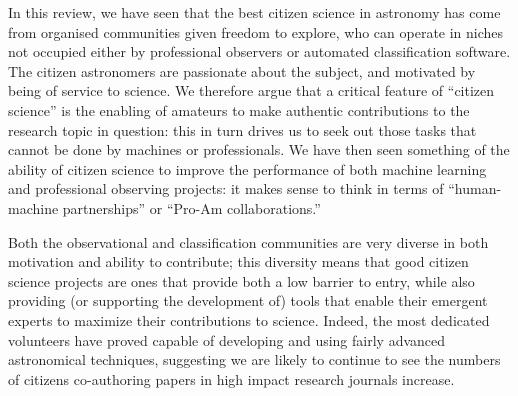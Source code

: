 \documentclass{ar2e}
\begin{document}
In this review, we have seen that the best citizen science in astronomy has
come from organised communities given freedom to explore, who can operate in 
niches not occupied either by professional observers or automated 
classification software. The citizen astronomers are passionate about the
subject, and  motivated by being of service to science. We therefore argue
that a critical feature of ``citizen science'' is the enabling of amateurs to
make authentic contributions to the research topic in question: this in turn
drives us to seek out those  tasks that cannot be done by machines or
professionals. We have then seen something of the ability of citizen science
to improve the performance of both machine learning and professional observing
projects: it makes sense to think in terms of ``human-machine partnerships''
or ``Pro-Am  collaborations.''

Both the observational and classification communities are very diverse in both
motivation and ability to contribute;  this diversity means that good citizen
science projects are ones that provide both a low barrier to entry, while also
providing (or supporting the development of) tools that enable their emergent
experts to maximize their contributions to science.  Indeed, the most
dedicated volunteers have proved capable of developing and using fairly
advanced astronomical techniques, suggesting we are likely to continue to see
the numbers of citizens co-authoring papers in high impact research journals
increase.



\end{document}
